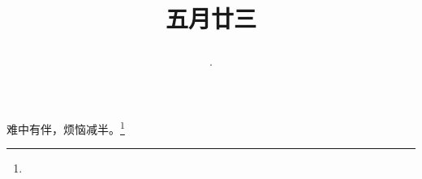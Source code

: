 \title{\date[d=28,m=6,y=2024][year:cn-y,年,month:cn,day:cn,日,·,weekday]·五月廿三 }
难中有伴，烦恼减半。\footnote{ }

